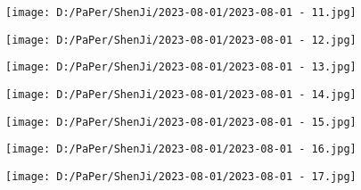 \documentclass{article}
\begin{document}
\begin{figure}[h!]
	\centering
	\texttt{[image: D:/PaPer/ShenJi/2023-08-01/2023-08-01 - 11.jpg]}
\end{figure}

\begin{figure}[h!]
	\centering
	\texttt{[image: D:/PaPer/ShenJi/2023-08-01/2023-08-01 - 12.jpg]}
\end{figure}

\begin{figure}[h!]
	\centering
	\texttt{[image: D:/PaPer/ShenJi/2023-08-01/2023-08-01 - 13.jpg]}
\end{figure}

\begin{figure}[h!]
	\centering
	\texttt{[image: D:/PaPer/ShenJi/2023-08-01/2023-08-01 - 14.jpg]}
\end{figure}

\begin{figure}[h!]
	\centering
	\texttt{[image: D:/PaPer/ShenJi/2023-08-01/2023-08-01 - 15.jpg]}
\end{figure}

\begin{figure}[h!]
	\centering
	\texttt{[image: D:/PaPer/ShenJi/2023-08-01/2023-08-01 - 16.jpg]}
\end{figure}

\begin{figure}[h!]
	\centering
	\texttt{[image: D:/PaPer/ShenJi/2023-08-01/2023-08-01 - 17.jpg]}
\end{figure}
\end{document}
